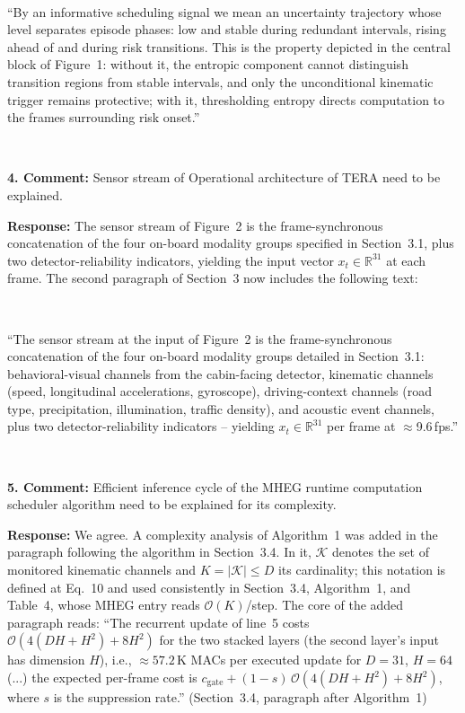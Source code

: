 \documentclass[1p,12pt,authoryear]{elsarticle}
\begin{document}
~

``By an informative scheduling signal we mean an uncertainty trajectory whose level separates episode phases: low and stable during redundant intervals, rising ahead of and during risk transitions. This is the property depicted in the central block of Figure~1: without it, the entropic component cannot distinguish transition regions from stable intervals, and only the unconditional kinematic trigger remains protective; with it, thresholding entropy directs computation to the frames surrounding risk onset.''

~

\noindent \textbf{4. Comment:} Sensor stream of Operational architecture of TERA need to be explained.

\vspace{2mm}
\noindent \textbf{Response:} The sensor stream of Figure~2 is the frame-synchronous concatenation of the four on-board modality groups specified in Section~3.1, plus two detector-reliability indicators, yielding the input vector $x_t \in \mathbb{R}^{31}$ at each frame. The second paragraph of Section~3 now includes the following text:

~

``The sensor stream at the input of Figure~2 is the frame-synchronous concatenation of the four on-board modality groups detailed in Section~3.1: behavioral-visual channels from the cabin-facing detector, kinematic channels (speed, longitudinal accelerations, gyroscope), driving-context channels (road type, precipitation, illumination, traffic density), and acoustic event channels, plus two detector-reliability indicators -- yielding $x_t \in \mathbb{R}^{31}$ per frame at $\approx$9.6\,fps.''

~

\noindent \textbf{5. Comment:} Efficient inference cycle of the MHEG runtime computation scheduler algorithm need to be explained for its complexity.

\vspace{2mm}
\noindent \textbf{Response:} We agree. A complexity analysis of Algorithm~1 was added in the paragraph following the algorithm in Section~3.4. In it, $\mathcal{K}$ denotes the set of monitored kinematic channels and $K = |\mathcal{K}| \le D$ its cardinality; this notation is defined at Eq.~10 and used consistently in Section~3.4, Algorithm~1, and Table~4, whose MHEG entry reads $\mathcal{O}(K)$/step. The core of the added paragraph reads: ``The recurrent update of line~5 costs $\mathcal{O}(4(DH{+}H^2)+8H^2)$ for the two stacked layers (the second layer's input has dimension $H$), i.e., ${\approx}57.2$\,K MACs per executed update for $D{=}31$, $H{=}64$ (...) the expected per-frame cost is $c_{\mathrm{gate}} + (1-s)\,\mathcal{O}(4(DH{+}H^2)+8H^2)$, where $s$ is the suppression rate.'' (Section~3.4, paragraph after Algorithm~1)
\end{document}
